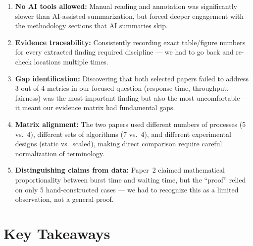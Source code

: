 \documentclass[11pt, a4paper]{article}
\begin{document}
\begin{enumerate}[nosep]
    \item \textbf{No AI tools allowed:} Manual reading and annotation was significantly slower than AI-assisted summarization, but forced deeper engagement with the methodology sections that AI summaries skip.
    \item \textbf{Evidence traceability:} Consistently recording exact table/figure numbers for every extracted finding required discipline --- we had to go back and re-check locations multiple times.
    \item \textbf{Gap identification:} Discovering that both selected papers failed to address 3 out of 4 metrics in our focused question (response time, throughput, fairness) was the most important finding but also the most uncomfortable --- it meant our evidence matrix had fundamental gaps.
    \item \textbf{Matrix alignment:} The two papers used different numbers of processes (5 vs.\ 4), different sets of algorithms (7 vs.\ 4), and different experimental designs (static vs.\ scaled), making direct comparison require careful normalization of terminology.
    \item \textbf{Distinguishing claims from data:} Paper~2 claimed mathematical proportionality between burst time and waiting time, but the ``proof'' relied on only 5 hand-constructed cases --- we had to recognize this as a limited observation, not a general proof.
\end{enumerate}

\section{Key Takeaways}
\end{document}

